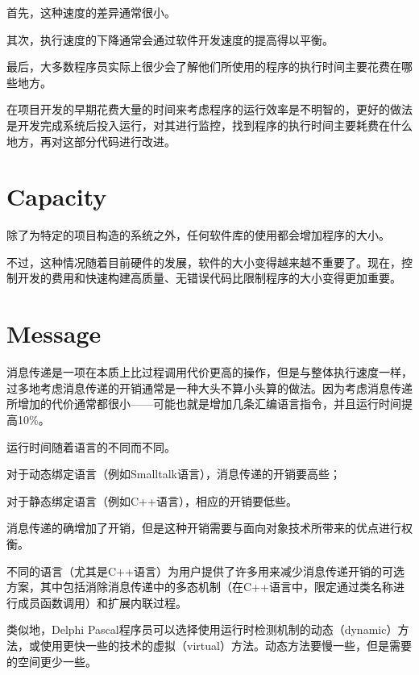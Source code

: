 \begin{compactitem}
\item 首先，这种速度的差异通常很小。
\item 其次，执行速度的下降通常会通过软件开发速度的提高得以平衡。
\item 最后，大多数程序员实际上很少会了解他们所使用的程序的执行时间主要花费在哪些地方。
\end{compactitem}

在项目开发的早期花费大量的时间来考虑程序的运行效率是不明智的，更好的做法是开发完成系统后投入运行，对其进行监控，找到程序的执行时间主要耗费在什么地方，再对这部分代码进行改进。

\section{Capacity}

除了为特定的项目构造的系统之外，任何软件库的使用都会增加程序的大小。

不过，这种情况随着目前硬件的发展，软件的大小变得越来越不重要了。现在，控制开发的费用和快速构建高质量、无错误代码比限制程序的大小变得更加重要。

\section{Message}

消息传递是一项在本质上比过程调用代价更高的操作，但是与整体执行速度一样，过多地考虑消息传递的开销通常是一种大头不算小头算的做法。因为考虑消息传递所增加的代价通常都很小——可能也就是增加几条汇编语言指令，并且运行时间提高10\%。

运行时间随着语言的不同而不同。

\begin{compactitem}
\item 对于动态绑定语言（例如Smalltalk语言），消息传递的开销要高些；
\item 对于静态绑定语言（例如C++语言），相应的开销要低些。
\end{compactitem}

消息传递的确增加了开销，但是这种开销需要与面向对象技术所带来的优点进行权衡。


不同的语言（尤其是C++语言）为用户提供了许多用来减少消息传递开销的可选方案，其中包括消除消息传递中的多态机制（在C++语言中，限定通过类名称进行成员函数调用）和扩展内联过程。

类似地，Delphi Pascal程序员可以选择使用运行时检测机制的动态（dynamic）方法，或使用更快一些的技术的虚拟（virtual）方法。动态方法要慢一些，但是需要的空间更少一些。

